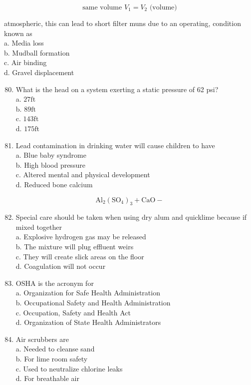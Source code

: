 \documentclass[10pt]{article}
\begin{document}
$$
\text { same volume } V_{1}=V_{2} \text { (volume) }
$$

atmospheric, this can lead to short filter muns due to an operating, condition known as\\
a. Media loss\\
b. Mudball formation\\
c. Air binding\\
d. Gravel displacement

\begin{enumerate}
  \setcounter{enumi}{79}
  \item What is the head on a system exerting a static pressure of 62 psi?\\
a. $27 \mathrm{ft}$\\
b. $89 \mathrm{ft}$\\
c. $143 \mathrm{ft}$\\
d. $175 \mathrm{ft}$

  \item Lead contamination in drinking water will cause children to have\\
a. Blue baby syndrome\\
b. High blood pressure\\
c. Altered mental and physical development\\
d. Reduced bone calcium

\end{enumerate}

$$
\mathrm{Al}_{2}\left(\mathrm{SO}_{4}\right)_{3}+\mathrm{CaO}-
$$

\begin{enumerate}
  \setcounter{enumi}{81}
  \item Special care should be taken when using dry alum and quicklime because if mixed together\\
a. Explosive hydrogen gas may be released\\
b. The mixture will plug effluent weirs\\
c. They will create slick areas on the floor\\
d. Coagulation will not occur

  \item OSHA is the acronym for\\
a. Organization for Safe Health Administration\\
b. Occupational Safety and Health Administration\\
c. Occupation, Safety and Health Act\\
d. Organization of State Health Administrators

  \item Air scrubbers are\\
a. Needed to cleanse sand\\
b. For lime room safety\\
c. Used to neutralize chlorine leaks\\
d. For breathable air

\end{enumerate}
\end{document}
